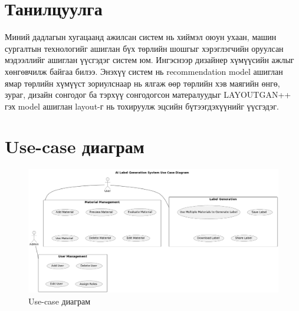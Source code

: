 \section{Танилцуулга}
Миний дадлагын хугацаанд ажилсан систем нь хиймэл оюун ухаан, машин сургалтын технологийг ашиглан бүх төрлийн шошгыг хэрэглэгчийн оруулсан мэдээллийг ашиглан үүсгэдэг систем юм. Ингэснээр дизайнер хүмүүсийн ажлыг хөнгөвчилж байгаа билээ. Энэхүү систем нь recommendation model ашиглан ямар төрлийн хүмүүст зориулснаар нь ялгаж өөр төрлийн хэв маягийн өнгө, зураг, дизайн сонгодог ба тэрхүү сонгодогсон матералуудыг LAYOUTGAN++ гэх model ашиглан layout-г нь тохируулж эцсийн бүтээгдэхүүнийг үүсгэдэг.
\section{Use-case диаграм}
\begin{figure}[h]
	\centering
	\includegraphics[scale=0.4]{src/pictures/usecase.png}
	\caption{Use-case диаграм}
\end{figure}
